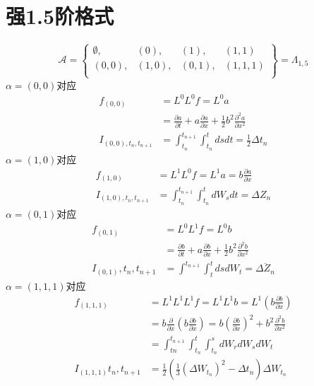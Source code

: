 \documentclass{article}%
\begin{document}
\section{强1.5阶格式}
\begin{equation}\mathcal{A}=\left\{\begin{array}{cccc}
\emptyset, & (0), & (1), & (1,1)\\
(0,0), & (1,0), & (0,1),& (1,1,1)\\
\end{array}\right\}=\Lambda_{1,5}\end{equation}
$\alpha=(0,0)$对应
\begin{equation}\begin{aligned}
f_{(0,0)} &=L^{0} L^{0} f=L^{0} a \\
&=\frac{\partial a}{\partial t}+a \frac{\partial a}{\partial x}+\frac{1}{2} b^{2} \frac{\partial^{2} a}{\partial x^{2}} \\
I_{(0,0), t_{n}, t_{n+1}} &=\int_{t_{n}}^{t_{n+1}} \int_{t_{n}}^{t} d s d t=\frac{1}{2} \Delta t_{n}
\end{aligned}\end{equation}
$\alpha=(1,0)$对应
\begin{equation}\begin{aligned}
f_{(1,0)} &=L^{1} L^{0} f=L^{1} a=b \frac{\partial a}{\partial x} \\
I_{(1,0), t_{n}, t_{n+1}} &=\int_{t_{n}}^{t_{n+1}} \int_{t_{n}}^{t} d W_{s} d t=\Delta Z_{n}
\end{aligned}\end{equation}
$\alpha=(0,1)$对应
\begin{equation}\begin{aligned}
f_{(0,1)} &=L^{0} L^{1} f=L^{0} b \\
&=\frac{\partial b}{\partial t}+a \frac{\partial b}{\partial x}+\frac{1}{2} b^{2} \frac{\partial^{2} b}{\partial x^{2}} \\
I_{(0,1)}, t_{n}, t_{n+1} &=\int^{t_{n+1}} \int_{t}^{t} d s d W_{t}=\overline{\Delta Z_{n}}
\end{aligned}\end{equation}
$\alpha=(1,1,1)$对应
\begin{equation}\begin{aligned}
f_{(1,1,1)} &=L^{1} L^{1} L^{1} f=L^{1} L^{1} b=L^{1}\left(b \frac{\partial b}{\partial x}\right) \\
&=b \frac{\partial}{\partial x}\left(b \frac{\partial b}{\partial x}\right)=b\left(\frac{\partial b}{\partial x}\right)^{2}+b^{2} \frac{\partial^{2} b}{\partial x^{2}} \\
&=\int_{t n}^{t_{n+1}} \int_{t_{n}}^{t} \int_{t_{n}}^{s} d W_{r} d W_{s} d W_{t} \\
I_{(1,1,1)} t_{n}, t_{n+1}&=\frac{1}{2}\left(\frac{1}{3}\left(\Delta W_{t_{n}}\right)^{2}-\Delta t_{n}\right) \Delta W_{t_{n}}
\end{aligned}\end{equation}
\end{document}
